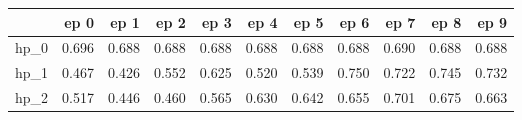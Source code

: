 \begin{tabular}{lrrrrrrrrrr}
\toprule
{} &   ep 0 &   ep 1 &   ep 2 &   ep 3 &   ep 4 &   ep 5 &   ep 6 &   ep 7 &   ep 8 &   ep 9 \\
\midrule
hp\_0 &  0.696 &  0.688 &  0.688 &  0.688 &  0.688 &  0.688 &  0.688 &  0.690 &  0.688 &  0.688 \\
hp\_1 &  0.467 &  0.426 &  0.552 &  0.625 &  0.520 &  0.539 &  0.750 &  0.722 &  0.745 &  0.732 \\
hp\_2 &  0.517 &  0.446 &  0.460 &  0.565 &  0.630 &  0.642 &  0.655 &  0.701 &  0.675 &  0.663 \\
\bottomrule
\end{tabular}
